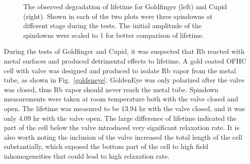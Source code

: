 \begin{figure}[t!]
	\centering
	\caption{{The observed degradation of lifetime for Goldfinger (left) and Cupid (right). Shown in each of the two plots were three spindowns at different stage during the tests. The initial amplitude of the spindowns were scaled to 1 for better comparison of lifetime.}}
	\label{T1_degradation}
\end{figure}

During the tests of Goldfinger and Cupid, it was suspected that Rb reacted with metal surfaces and produced detrimental effects to lifetime. A gold coated OFHC cell with valve was designed and produced to isolate Rb vapor from the metal tube, as shown in Fig.~\ref{goldeneye}. GoldenEye was only polarized after the valve was closed, thus Rb vapor should never reach the metal tube. Spindown measurements were taken at room temperature both with the valve closed and open. The lifetime was measured to be 13.94 hr with the valve closed, and it was only 4.09 hr with the valve open. The large difference of lifetime indicated the part of the cell below the valve introduced very significant relaxation rate. It is also worth noting the inclusion of the valve increased the total length of the cell substantially, which exposed the bottom part of the cell to high field inhomogeneities that could lead to high relaxation rate.

